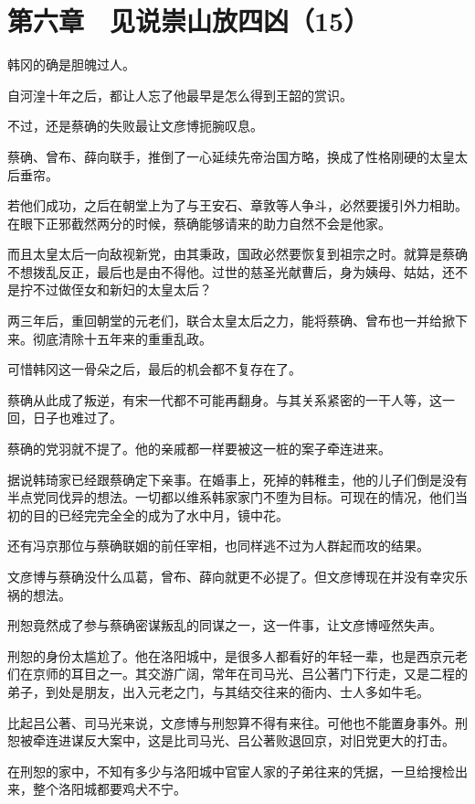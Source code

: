 \section{第六章　见说崇山放四凶（15）}

韩冈的确是胆魄过人。

自河湟十年之后，都让人忘了他最早是怎么得到王韶的赏识。

不过，还是蔡确的失败最让文彦博扼腕叹息。

蔡确、曾布、薛向联手，推倒了一心延续先帝治国方略，换成了性格刚硬的太皇太后垂帘。

若他们成功，之后在朝堂上为了与王安石、章敦等人争斗，必然要援引外力相助。在眼下正邪截然两分的时候，蔡确能够请来的助力自然不会是他家。

而且太皇太后一向敌视新党，由其秉政，国政必然要恢复到祖宗之时。就算是蔡确不想拨乱反正，最后也是由不得他。过世的慈圣光献曹后，身为姨母、姑姑，还不是拧不过做侄女和新妇的太皇太后？

两三年后，重回朝堂的元老们，联合太皇太后之力，能将蔡确、曾布也一并给掀下来。彻底清除十五年来的重重乱政。

可惜韩冈这一骨朵之后，最后的机会都不复存在了。

蔡确从此成了叛逆，有宋一代都不可能再翻身。与其关系紧密的一干人等，这一回，日子也难过了。

蔡确的党羽就不提了。他的亲戚都一样要被这一桩的案子牵连进来。

据说韩琦家已经跟蔡确定下亲事。在婚事上，死掉的韩稚圭，他的儿子们倒是没有半点党同伐异的想法。一切都以维系韩家家门不堕为目标。可现在的情况，他们当初的目的已经完完全全的成为了水中月，镜中花。

还有冯京那位与蔡确联姻的前任宰相，也同样逃不过为人群起而攻的结果。

文彦博与蔡确没什么瓜葛，曾布、薛向就更不必提了。但文彦博现在并没有幸灾乐祸的想法。

刑恕竟然成了参与蔡确密谋叛乱的同谋之一，这一件事，让文彦博哑然失声。

刑恕的身份太尴尬了。他在洛阳城中，是很多人都看好的年轻一辈，也是西京元老们在京师的耳目之一。其交游广阔，常年在司马光、吕公著门下行走，又是二程的弟子，到处是朋友，出入元老之门，与其结交往来的衙内、士人多如牛毛。

比起吕公著、司马光来说，文彦博与刑恕算不得有来往。可他也不能置身事外。刑恕被牵连进谋反大案中，这是比司马光、吕公著败退回京，对旧党更大的打击。

在刑恕的家中，不知有多少与洛阳城中官宦人家的子弟往来的凭据，一旦给搜检出来，整个洛阳城都要鸡犬不宁。

